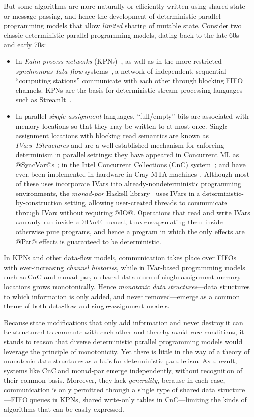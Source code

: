 \documentclass{article}
\begin{document}
But some algorithms are more naturally or efficiently written using
shared state or message passing, and hence the development of
deterministic parallel programming models that allow \emph{limited}
sharing of mutable state.  Consider two classic deterministic parallel
programming models, dating back to the late 60s and early 70s:
\begin{itemize}
\item In \emph{Kahn process networks} (KPNs)~\cite{Kahn-1974}, as well
  as in the more restricted \emph{synchronous data flow}
  systems~\cite{lee-sdn}, a network of independent, sequential
  ``computing stations'' communicate with each other through blocking
  FIFO channels.  KPNs are the basis for deterministic stream-processing
  languages such as StreamIt~\cite{streamit-asplos}.
\item In parallel \emph{single-assignment} languages, ``full/empty''
  bits are associated with memory locations so that they may be
  written to at most once. Single-assignment locations with blocking
  read semantics are known as \emph{IVars}~\emph{IStructures} and are
  a well-established mechanism for enforcing determinism in parallel
  settings: they have appeared in Concurrent ML as
  @SyncVar@s~\cite{reppy-cml-book}; in the Intel Concurrent
  Collections (CnC) system~\cite{CnC}; and have even been implemented
  in hardware in Cray MTA machines~\cite{cray-mta}.  Although most of
  these uses incorporate IVars into already-nondeterministic
  programming environments, the \emph{monad-par} Haskell
  library~\cite{monad-par} uses IVars in a
  deterministic-by-construction setting, allowing user-created threads
  to communicate through IVars without requiring @IO@.  Operations
  that read and write IVars can only run inside a @Par@ monad, thus
  encapsulating them inside otherwise pure programs, and hence a
  program in which the only effects are @Par@ effects is guaranteed to
  be deterministic.
\end{itemize}
In KPNs and other data-flow models, communication takes place over
FIFOs with ever-increasing \emph{channel histories}, while in
IVar-based programming models such as CnC and monad-par, a shared data
store of single-assignment memory locations grows monotonically.
Hence \emph{monotonic data structures}---data structures to which
information is only added, and never removed---emerge as a common
theme of both data-flow and single-assignment models.

Because state modifications that only add information and never
destroy it can be structured to commute with each other and thereby
avoid race conditions, it stands to reason that diverse deterministic
parallel programming models would leverage the principle of
monotonicity.  Yet there is little in the way of a theory of monotonic
data structures as a bais for deterministic parallelism.  As a result,
systems like CnC and monad-par emerge independently, without
recognition of their common basis.  Moreover, they lack
\emph{generality}, because in each case, communication is only
permitted through a single type of shared data structure---FIFO queues
in KPNs, shared write-only tables in CnC---limiting the kinds of
algorithms that can be easily expressed.
\end{document}
